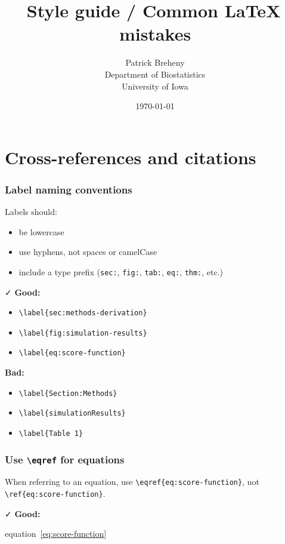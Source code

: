 \documentclass{article}
\title{Style guide / Common \LaTeX \, mistakes}
\author{Patrick Breheny \\ Department of Biostatistics \\ University of Iowa}
\date{\today}
\newcommand{\xmark}{\textcolor{red}{\faXmark}}
\newcommand{\cmark}{\textcolor{goodcolor}{\faCheck}}
\newcommand{\bad}{\xmark\; \textbf{Bad:}}
\newcommand{\good}{\cmark\; \textbf{Good:}}
\begin{document}
\maketitle

\section{Cross-references and citations}

\subsubsection*{Label naming conventions}

Labels should:

\begin{itemize}
\item be lowercase
\item use hyphens, not spaces or camelCase
\item include a type prefix (\texttt{sec:}, \texttt{fig:}, \texttt{tab:}, \texttt{eq:}, \texttt{thm:}, etc.)
\end{itemize}

\good

\begin{itemize}
\item \verb|\label{sec:methods-derivation}|
\item \verb|\label{fig:simulation-results}|
\item \verb|\label{eq:score-function}|
\end{itemize}

\bad

\begin{itemize}
\item \verb|\label{Section:Methods}|
\item \verb|\label{simulationResults}|
\item \verb|\label{Table 1}|
\end{itemize}

\subsubsection*{Use \texttt{\textbackslash eqref} for equations}

When referring to an equation, use \verb|\eqref{eq:score-function}|, not \verb|\ref{eq:score-function}|.

\good

\begin{LTXexample}
equation~\eqref{eq:score-function}
\end{LTXexample}
\end{document}

